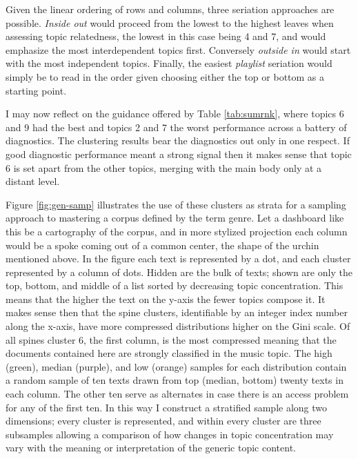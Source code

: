 \documentclass[]{book}
\theoremstyle{definition}
\theoremstyle{definition}
\theoremstyle{definition}
\theoremstyle{remark}
\begin{document}
Given the linear ordering of rows and columns, three seriation
approaches are possible. \emph{Inside out} would proceed from the lowest
to the highest leaves when assessing topic relatedness, the lowest in
this case being 4 and 7, and would emphasize the most interdependent
topics first. Conversely \emph{outside in} would start with the most
independent topics. Finally, the easiest \emph{playlist} seriation would
simply be to read in the order given choosing either the top or bottom
as a starting point.

I may now reflect on the guidance offered by Table \ref{tab:sumrnk},
where topics 6 and 9 had the best and topics 2 and 7 the worst
performance across a battery of diagnostics. The clustering results bear
the diagnostics out only in one respect. If good diagnostic performance
meant a strong signal then it makes sense that topic 6 is set apart from
the other topics, merging with the main body only at a distant level.

Figure \ref{fig:gen-samp} illustrates the use of these clusters as
strata for a sampling approach to mastering a corpus defined by the term
genre. Let a dashboard like this be a cartography of the corpus, and in
more stylized projection each column would be a spoke coming out of a
common center, the shape of the urchin mentioned above. In the figure
each text is represented by a dot, and each cluster represented by a
column of dots. Hidden are the bulk of texts; shown are only the top,
bottom, and middle of a list sorted by decreasing topic concentration.
This means that the higher the text on the y-axis the fewer topics
compose it. It makes sense then that the spine clusters, identifiable by
an integer index number along the x-axis, have more compressed
distributions higher on the Gini scale. Of all spines cluster 6, the
first column, is the most compressed meaning that the documents
contained here are strongly classified in the music topic. The high
(green), median (purple), and low (orange) samples for each distribution
contain a random sample of ten texts drawn from top (median, bottom)
twenty texts in each column. The other ten serve as alternates in case
there is an access problem for any of the first ten. In this way I
construct a stratified sample along two dimensions; every cluster is
represented, and within every cluster are three subsamples allowing a
comparison of how changes in topic concentration may vary with the
meaning or interpretation of the generic topic content.
\end{document}
